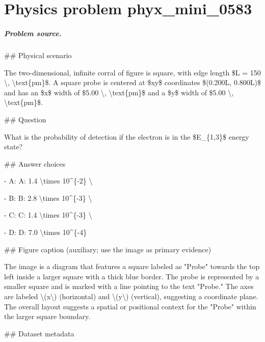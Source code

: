 
\chapter{Physics problem phyx\_mini\_0583}
\label{ch:PhyXMiniProblems_problem_phyx_mini_0583}

\paragraph{Problem source.}
\#\# Physical scenario

The two-dimensional, infinite corral of figure is square, with edge length \$L = 150 \textbackslash{}, \textbackslash{}text\{pm\}\$. A square probe is centered at \$xy\$ coordinates \$(0.200L, 0.800L)\$ and has an \$x\$ width of \$5.00 \textbackslash{}, \textbackslash{}text\{pm\}\$ and a \$y\$ width of \$5.00 \textbackslash{}, \textbackslash{}text\{pm\}\$.

\#\# Question

What is the probability of detection if the electron is in the \$E\_\{1,3\}\$ energy state?

\#\# Answer choices

- A: A: 1.4 \textbackslash{}times 10\textasciicircum{}\{-2\} \textbackslash{}

- B: B: 2.8 \textbackslash{}times 10\textasciicircum{}\{-3\} \textbackslash{}

- C: C: 1.4 \textbackslash{}times 10\textasciicircum{}\{-3\} \textbackslash{}

- D: D: 7.0 \textbackslash{}times 10\textasciicircum{}\{-4\}

\#\# Figure caption (auxiliary; use the image as primary evidence)

The image is a diagram that features a square labeled as "Probe" towards the top left inside a larger square with a thick blue border. The probe is represented by a smaller square and is marked with a line pointing to the text "Probe." The axes are labeled \textbackslash{}(x\textbackslash{}) (horizontal) and \textbackslash{}(y\textbackslash{}) (vertical), suggesting a coordinate plane. The overall layout suggests a spatial or positional context for the "Probe" within the larger square boundary.

\#\# Dataset metadata

